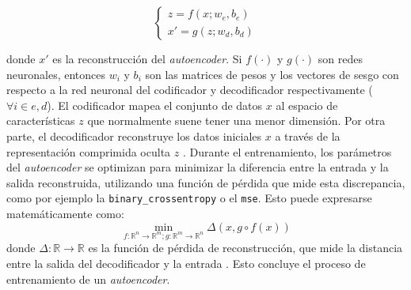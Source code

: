 \begin{equation}
\begin{cases}
z = f(x; w_e, b_e) \\
x' = g(z; w_d, b_d)
\end{cases}
\label{eq:ae_model}
\end{equation}

donde $x'$ es la reconstrucción del \textit{autoencoder}. Si $f(\cdot)$ y $g(\cdot)$ son redes neuronales, entonces $w_i$ y $b_i$ son las matrices de pesos y los vectores de sesgo con respecto a la red neuronal del codificador y decodificador respectivamente ($ \forall i \in  {e, d}$). El codificador mapea el conjunto de datos $x$ al espacio de características $z$ que normalmente suene tener una menor dimensión. Por otra parte, el decodificador reconstruye los datos iniciales $x$ a través de la representación comprimida oculta $z$ \citep{zhai2018autoencoder}. Durante el entrenamiento, los parámetros del \textit{autoencoder} se optimizan para minimizar la diferencia entre la entrada y la salida reconstruida, utilizando una función de pérdida que mide esta discrepancia, como por ejemplo la \lstinline|binary_crossentropy| o el \lstinline|mse|. Esto puede expresarse matemáticamente como:
\begin{equation}
\min_{f : \mathbb{R}^n \to \mathbb{R}^m ; g: \mathbb{R}^m \to \mathbb{R}^n} \Delta(x, g \circ f(x))
\end{equation}
donde $\Delta : \mathbb{R} \to \mathbb{R}$ es la función de pérdida de reconstrucción, que mide la distancia entre la salida del decodificador y la entrada \citep{bank2023autoencoders}. Esto concluye el proceso de entrenamiento de un \textit{autoencoder}.

